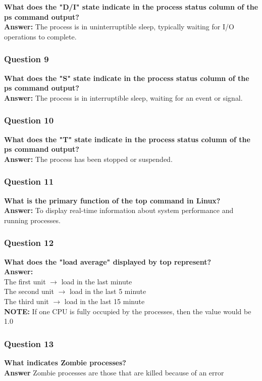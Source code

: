 \documentclass{article}
\begin{document}
\textbf{What does the "D/I" state indicate in the process status column of the ps command output?} \\
\textbf{Answer:} The process is in uninterruptible sleep, typically waiting for I/O operations to complete.

\subsubsection*{Question 9}

\textbf{What does the "S" state indicate in the process status column of the ps command output?} \\
\textbf{Answer:} The process is in interruptible sleep, waiting for an event or signal.

\subsubsection*{Question 10}
\textbf{What does the "T" state indicate in the process status column of the ps command output?} \\
\textbf{Answer:} The process has been stopped or suspended.

\subsubsection*{Question 11}
\textbf{What is the primary function of the top command in Linux?} \\
\textbf{Answer:} To display real-time information about system performance and running processes.

\subsubsection*{Question 12}
\textbf{What does the "load average" displayed by top represent?} \\
\textbf{Answer:} \\
The first unit $\rightarrow$ load in the last minute \\
The second unit $\rightarrow$ load in the last 5 minute \\
The third unit $\rightarrow$ load in the last 15 minute \\
\textbf{NOTE:} If one CPU is fully occupied by the processes, then the value would be 1.0

\subsubsection*{Question 13}
\textbf{What indicates Zombie processes?} \\
\textbf{Answer} Zombie processes are those that are killed because of an error
\end{document}
